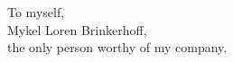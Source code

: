 \begin{dedication}
\null\vfil
{\large
\begin{center}
To myself,\\\vspace{12pt}
Mykel Loren Brinkerhoff,\\\vspace{12pt}
the only person worthy of my company.
\end{center}}
\vfil\null
\end{dedication}